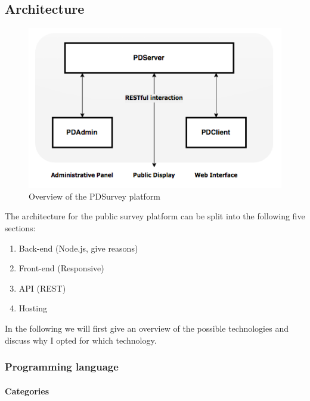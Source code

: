 
\subsection{Architecture}
\label{4b_architecture}

\begin{figure}%
    \begin{center}
        \includegraphics[width=.7\columnwidth]{img/4_implementation/4-overview}
    \end{center}
 \caption{Overview of the PDSurvey platform}
 \label{fig:4-pdsurvey-platform}
\end{figure}


The architecture for the public survey platform can be split into the following five sections:

\begin{enumerate}[itemsep=0pt] 
\item Back-end (Node.js, give reasons)
\item Front-end (Responsive)
\item API (REST)
\item Hosting
\end{enumerate}

In the following we will first give an overview of the possible technologies and discuss why I opted for which technology.




\subsubsection{Programming language}

\paragraph{Categories}

